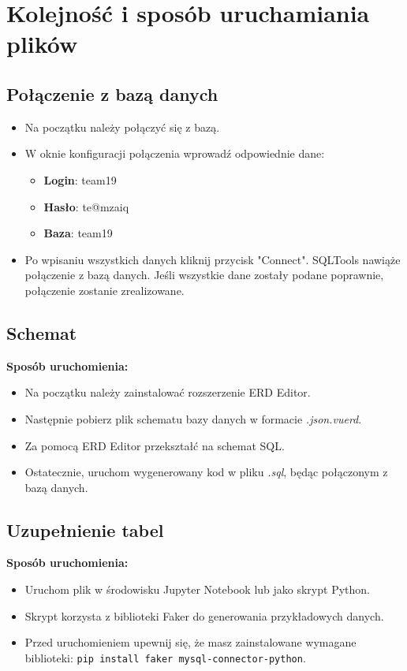 \documentclass{article}
\theoremstyle{definition}
\begin{document}
	\section{Kolejność i sposób uruchamiania plików}
	\subsection{Połączenie z bazą danych}
	\begin{itemize}
		\item Na początku należy połączyć się z bazą.
		\item W oknie konfiguracji połączenia wprowadź odpowiednie dane:
		\begin{itemize}
			\item \textbf{Login}: team19
			\item \textbf{Hasło}: te@mzaiq
			\item \textbf{Baza}: team19
		\end{itemize}
		\item Po wpisaniu wszystkich danych kliknij przycisk "Connect". SQLTools nawiąże połączenie z bazą danych. Jeśli wszystkie dane zostały podane poprawnie, połączenie zostanie zrealizowane.
	\end{itemize}
	
	\subsection{Schemat}
	\textbf{Sposób uruchomienia:}
	\begin{itemize}
		\item Na początku należy zainstalować rozszerzenie ERD Editor.
		\item Następnie pobierz plik schematu bazy danych w formacie \textit{.json.vuerd}.
		\item Za pomocą ERD Editor przekształć na schemat SQL.
		\item Ostatecznie, uruchom wygenerowany kod w pliku \textit{.sql}, będąc połączonym z bazą danych.
	\end{itemize}
	
	\subsection{Uzupełnienie tabel}
	\textbf{Sposób uruchomienia:}
	\begin{itemize}
		\item Uruchom plik w środowisku Jupyter Notebook lub jako skrypt Python.
		\item Skrypt korzysta z biblioteki Faker do generowania przykładowych danych.
		\item Przed uruchomieniem upewnij się, że masz zainstalowane wymagane biblioteki: \texttt{pip install faker mysql-connector-python}.
	\end{itemize}
	
\end{document}
